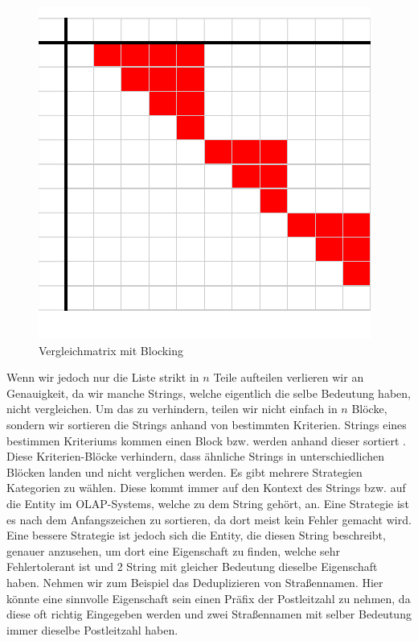 \documentclass[sigconf]{acmart}
\begin{document}
\begin{figure}[htbp]
  \centering
  \includegraphics{table2.pdf}
  \caption{Vergleichmatrix mit Blocking}
  \label{abb:matrixblock}
\end{figure}

Wenn wir jedoch nur die Liste strikt in $n$
Teile aufteilen verlieren wir an Genauigkeit, da wir
manche Strings, welche eigentlich die selbe Bedeutung haben,
nicht vergleichen.
Um das zu verhindern, teilen wir nicht einfach in $n$
Blöcke, sondern wir sortieren die Strings anhand von
bestimmten Kriterien. Strings eines bestimmen Kriteriums kommen
einen Block bzw. werden anhand dieser sortiert \cite[Vlg. S. 11]{elmagarmid1}.
Diese Kriterien-Blöcke verhindern, dass
ähnliche Strings in unterschiedlichen Blöcken landen
und nicht verglichen werden.
Es gibt mehrere Strategien Kategorien zu wählen. Diese
kommt immer auf den Kontext des Strings bzw. auf die Entity 
im OLAP-Systems, welche zu dem String gehört, an.
Eine Strategie ist es nach dem Anfangszeichen zu
sortieren, da dort meist kein Fehler gemacht wird.
Eine bessere Strategie ist jedoch sich die Entity,
die diesen String beschreibt, genauer anzusehen,
um dort eine Eigenschaft zu finden, welche sehr
Fehlertolerant ist und 2 String mit gleicher Bedeutung
dieselbe Eigenschaft haben.
Nehmen wir zum Beispiel das Deduplizieren von
Straßennamen. Hier könnte eine sinnvolle
Eigenschaft sein einen Präfix der
Postleitzahl zu nehmen, da diese oft richtig
Eingegeben werden und zwei Straßennamen mit selber
Bedeutung immer dieselbe Postleitzahl haben.
\end{document}
